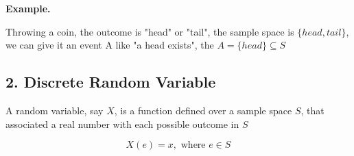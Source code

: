 %
%	
%
%	
%	
%
%	
%


%	

\textbf{Example.}

Throwing a coin, the outcome is "head" or "tail",  the sample space is $\{head,tail\}$, we can give it an event A like "a head exists", the $A = \{head\} \subseteq S$

\newpage

\subsection*{2. Discrete Random Variable}

\begin{defn}
	A random variable, say $X$, is a function defined over a sample space $S$, that associated a real number with each possible outcome in $S$
	
	$$X(e) = x, \text{ where } e \in S$$
\end{defn}

